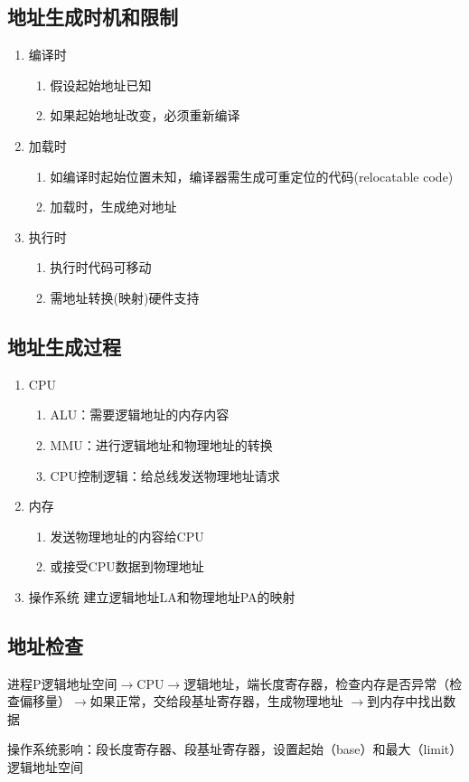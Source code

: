 \subsection{地址生成时机和限制}
\begin{enumerate}
	\item 编译时
	\begin{enumerate}
		\item 假设起始地址已知
		\item 如果起始地址改变，必须重新编译
	\end{enumerate}
	\item 加载时
	\begin{enumerate}
		\item 如编译时起始位置未知，编译器需生成可重定位的代码(relocatable code)
		\item 加载时，生成绝对地址
	\end{enumerate}
	\item 执行时
	\begin{enumerate}
		\item 执行时代码可移动
		\item 需地址转换(映射)硬件支持
	\end{enumerate}
\end{enumerate}
\subsection{地址生成过程}
\begin{enumerate}
	\item CPU
	\begin{enumerate}
		\item ALU：需要逻辑地址的内存内容
		\item MMU：进行逻辑地址和物理地址的转换
		\item CPU控制逻辑：给总线发送物理地址请求
	\end{enumerate}
	\item 内存
	\begin{enumerate}
		\item 发送物理地址的内容给CPU
		\item 或接受CPU数据到物理地址
	\end{enumerate}
	\item 操作系统
	\subitem 建立逻辑地址LA和物理地址PA的映射
\end{enumerate}
\subsection{地址检查}
进程P逻辑地址空间$\rightarrow$CPU$\rightarrow$逻辑地址，端长度寄存器，检查内存是否异常（检查偏移量）$\rightarrow$如果正常，交给段基址寄存器，生成物理地址
$\rightarrow$到内存中找出数据\par
操作系统影响：段长度寄存器、段基址寄存器，设置起始（base）和最大（limit）
逻辑地址空间

